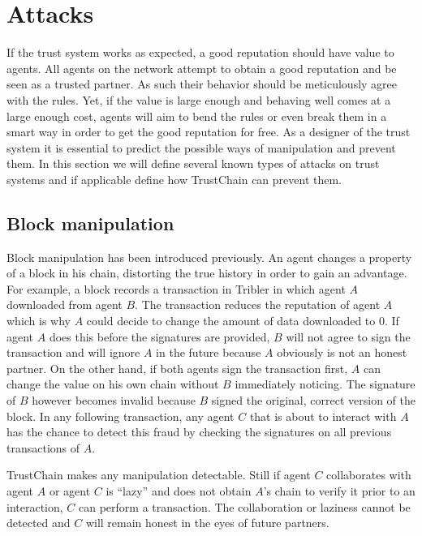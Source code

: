 \section{Attacks}
\label{sec:attacks}
If the trust system works as expected, a good reputation should have value to agents. All agents on 
the network attempt to obtain a good reputation and be seen as a trusted partner. As such their 
behavior should be meticulously agree with the rules. Yet, if the value is large enough and behaving
well comes at a large enough cost, agents will aim to bend the rules or even break them in a smart 
way in order to get the good reputation for free. As a designer of the trust system it is essential
to predict the possible ways of manipulation and prevent them. In this section we will define several
known types of attacks on trust systems and if applicable define how TrustChain can prevent them.

\subsection{Block manipulation}
\label{sec:tampering}
Block manipulation has been introduced previously. An agent changes a property of a block in his 
chain, distorting the true history in order to gain an advantage. For example, a block records a 
transaction in Tribler in which agent $A$ downloaded from agent $B$. The transaction reduces the 
reputation of agent $A$ which is why $A$ could decide to change the amount of data downloaded to 0.
If agent $A$ does this before the signatures are provided, $B$ will not agree to sign the transaction
and will ignore $A$ in the future because $A$ obviously is not an honest partner. On the other hand,
if both agents sign the transaction first, $A$ can change the value on his own chain without $B$ 
immediately noticing. The signature of $B$ however becomes invalid because $B$ signed the original, 
correct version of the block. In any following transaction, any agent $C$ that is about to interact
with $A$ has the chance to detect this fraud by checking the signatures on all previous transactions
of $A$. 

TrustChain makes any manipulation detectable. Still if agent $C$ collaborates with agent $A$ or 
agent $C$ is ``lazy'' and does not obtain $A$'s chain to verify it prior to an interaction, $C$ can 
perform a transaction. The collaboration or laziness cannot be detected and $C$ will remain honest 
in the eyes of future partners.


